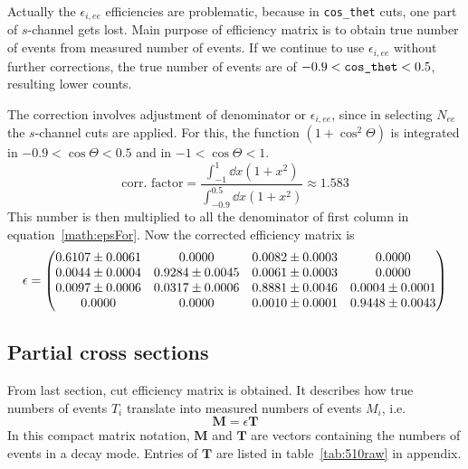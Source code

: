 Actually the $\epsilon_{i, ee}$ efficiencies are problematic, because in \verb|cos_thet| cuts, one part of $s$-channel gets lost. Main purpose of efficiency matrix is to obtain true number of events from measured number of events. If we continue to use $\epsilon_{i, ee}$ without further corrections, the true number of events are of $-0.9 < \verb|cos_thet| < 0.5$, resulting lower counts. 

The correction involves adjustment of denominator or $\epsilon_{i, ee}$, since in selecting $N_{ee}$ the $s$-channel cuts are applied. For this, the function $(1+\cos^2\Theta)$ is integrated in $-0.9 < \cos\Theta < 0.5 $  and in $-1 < \cos\Theta < 1$.
\begin{equation}
	\text{corr. factor} = \frac{\int_{-1}^{1} \dd{x} (1+x^2)}{ \int_{-0.9}^{0.5}\dd{x} (1+x^2)} \approx \num{1.583}
\end{equation}
This number is then multiplied to all the denominator of first column in equation~\ref{math:epsFor}. Now the corrected efficiency matrix is
\begin{equation}
	\epsilon = \begin{pmatrix} \num{0.6107 +- 0.0061} & \num{0.0000 +- 0.0000} & \num{0.0082 +- 0.0003} & \num{0.0000 +- 0.0000} \\ 
								\num{0.0044 +- 0.0004} & \num{0.9284 +- 0.0045} & \num{0.0061 +- 0.0003} & \num{0.0000 +- 0.0000} \\
								\num{0.0097 +- 0.0006} & \num{0.0317 +- 0.0006} & \num{0.8881 +- 0.0046} & \num{0.0004 +- 0.0001} \\
								\num{0.0000 +- 0.0000} & \num{0.0000 +- 0.0000} & \num{0.0010 +- 0.0001} & \num{0.9448 +- 0.0043} 
	\end{pmatrix}
\end{equation}





\subsection{Partial cross sections}
From last section, cut efficiency matrix is obtained. It describes how true numbers of events $T_i$ translate into measured numbers of events $M_i$, i.e.
\begin{equation}
	\mathbf{M} = \epsilon \mathbf{T}
\end{equation}
In this compact matrix notation, $\mathbf{M}$ and $\mathbf{T}$ are vectors containing the numbers of events in a decay mode. Entries of $\mathbf{T}$ are listed in table~\ref{tab:510raw} in appendix.

